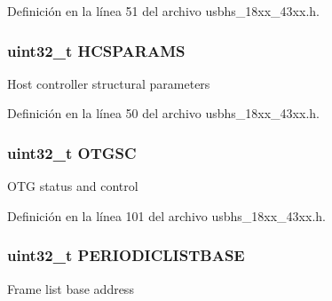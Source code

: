 Definición en la línea 51 del archivo usbhs\+\_\+18xx\+\_\+43xx.\+h.

\subsubsection[{\texorpdfstring{H\+C\+S\+P\+A\+R\+A\+MS}{HCSPARAMS}}]{ uint32\+\_\+t H\+C\+S\+P\+A\+R\+A\+MS}\hypertarget{struct_l_p_c___u_s_b_h_s___t_ae39ae814acf9cd8199acd30e6603e6ff}{}\label{struct_l_p_c___u_s_b_h_s___t_ae39ae814acf9cd8199acd30e6603e6ff}
Host controller structural parameters 

Definición en la línea 50 del archivo usbhs\+\_\+18xx\+\_\+43xx.\+h.

\subsubsection[{\texorpdfstring{O\+T\+G\+SC}{OTGSC}}]{ uint32\+\_\+t O\+T\+G\+SC}\hypertarget{struct_l_p_c___u_s_b_h_s___t_adb35a61c216301a0918d07fd20b51dcb}{}\label{struct_l_p_c___u_s_b_h_s___t_adb35a61c216301a0918d07fd20b51dcb}
O\+TG status and control 

Definición en la línea 101 del archivo usbhs\+\_\+18xx\+\_\+43xx.\+h.

\subsubsection[{\texorpdfstring{P\+E\+R\+I\+O\+D\+I\+C\+L\+I\+S\+T\+B\+A\+SE}{PERIODICLISTBASE}}]{ uint32\+\_\+t P\+E\+R\+I\+O\+D\+I\+C\+L\+I\+S\+T\+B\+A\+SE}\hypertarget{struct_l_p_c___u_s_b_h_s___t_a220024dbd2ce8566ae29c4fd779bdfea}{}\label{struct_l_p_c___u_s_b_h_s___t_a220024dbd2ce8566ae29c4fd779bdfea}
Frame list base address 

